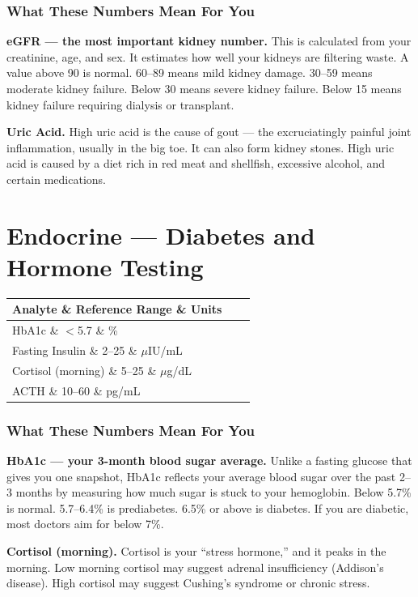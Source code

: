 \subsubsection{What These Numbers Mean For You}

\textbf{eGFR --- the most important kidney number.} This is calculated from your creatinine, age, and sex. It estimates how well your kidneys are filtering waste. A value above 90 is normal. 60--89 means mild kidney damage. 30--59 means moderate kidney failure. Below 30 means severe kidney failure. Below 15 means kidney failure requiring dialysis or transplant.

\textbf{Uric Acid.} High uric acid is the cause of gout --- the excruciatingly painful joint inflammation, usually in the big toe. It can also form kidney stones. High uric acid is caused by a diet rich in red meat and shellfish, excessive alcohol, and certain medications.

\clearpage
\section{Endocrine --- Diabetes and Hormone Testing}

\begin{longtable}{@{}lll@{}}
\toprule
\textbf{Analyte} \& \textbf{Reference Range} \& \textbf{Units} \\
\midrule
HbA1c \& $<$5.7 \& \% \\
Fasting Insulin \& 2--25 \& $\mu$IU/mL \\
Cortisol (morning) \& 5--25 \& $\mu$g/dL \\
ACTH \& 10--60 \& pg/mL \\
\bottomrule
\end{longtable}

\subsubsection{What These Numbers Mean For You}

\textbf{HbA1c --- your 3-month blood sugar average.} Unlike a fasting glucose that gives you one snapshot, HbA1c reflects your average blood sugar over the past 2--3 months by measuring how much sugar is stuck to your hemoglobin. Below 5.7\% is normal. 5.7--6.4\% is prediabetes. 6.5\% or above is diabetes. If you are diabetic, most doctors aim for below 7\%.

\textbf{Cortisol (morning).} Cortisol is your ``stress hormone,'' and it peaks in the morning. Low morning cortisol may suggest adrenal insufficiency (Addison's disease). High cortisol may suggest Cushing's syndrome or chronic stress.

